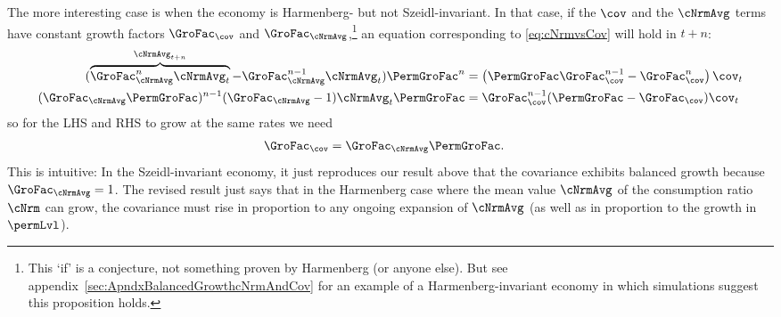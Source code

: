 \documentclass[BufferStockTheory]{subfiles}
\begin{document}
The more interesting case is when the economy is Harmenberg- but not Szeidl-invariant.  In that case, if the $\cov$ and the $\cNrmAvg$ terms have constant growth factors $\GroFac_{\cov}$ and $\GroFac_{\cNrmAvg}$,\footnote{This `if' is a conjecture, not something proven by Harmenberg (or anyone else).  But see appendix~\ref{sec:ApndxBalancedGrowthcNrmAndCov} for an example of a Harmenberg-invariant economy in which simulations suggest this proposition holds.} an equation corresponding to \eqref{eq:cNrmvsCov} will hold in $t+n$:
\begin{equation} \label{eq:aNrmGrovsCovGronm1}
  \begin{split}
    (\overbrace{\GroFac_{\cNrmAvg}^{n}\cNrmAvg_{t}}^{\cNrmAvg_{t+n}}-\GroFac^{n-1}_{\cNrmAvg}\cNrmAvg_{t})\PermGroFac^{n} & = \left(\PermGroFac\GroFac_{\cov}^{n-1} -\GroFac_{\cov}^{n}\right)\cov_{t}
    \\ (\GroFac_{\cNrmAvg}\PermGroFac)^{n-1} (\GroFac_{\cNrmAvg}-1)\cNrmAvg_{t}\PermGroFac & = \GroFac_{\cov}^{n-1}(\PermGroFac - \GroFac_{\cov}) \cov_{t}
  \end{split}
\end{equation}
so for the LHS and RHS to grow at the same rates we need
\begin{align}
  \GroFac_{\cov}  & = \GroFac_{\cNrmAvg}\PermGroFac \label{eq:aNrmGrovscovGro}.
\end{align}
This is intuitive:  In the Szeidl-invariant economy, it just reproduces our result above that the covariance exhibits balanced growth because $\GroFac_{\cNrmAvg}=1$.  The revised result just says that in the Harmenberg case where the mean value $\cNrmAvg$ of the consumption ratio $\cNrm$ can grow, the covariance must rise in proportion to any ongoing expansion of $\cNrmAvg$ (as well as in proportion to the growth in $\permLvl$).
\end{document}
